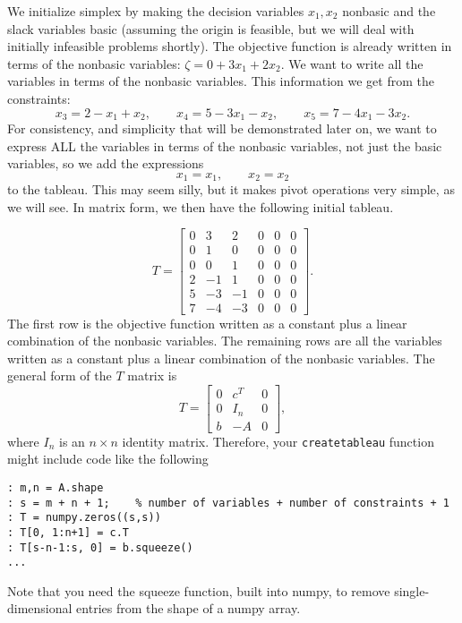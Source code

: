 We initialize simplex by making the decision variables $x_1, x_2$ nonbasic and the slack variables basic (assuming the origin is feasible, but we will deal with initially infeasible problems shortly).
The objective function is already written in terms of the nonbasic variables: $\zeta = 0 + 3x_1 + 2x_2$.
We want to write all the variables in terms of the nonbasic variables. This information we get from the constraints:
\[ x_3 = 2 - x_1 + x_2, \qquad x_4 = 5 - 3x_1 - x_2, \qquad x_5 = 7 - 4x_1 - 3x_2. \]
For consistency, and simplicity that will be demonstrated later on, we want to express ALL the variables in terms of the nonbasic variables, not just the basic variables, so we add the expressions
\[ x_1 = x_1, \qquad x_2 = x_2 \]
to the tableau.
This may seem silly, but it makes pivot operations very simple, as we will see.
In matrix form, we then have the following initial tableau.

\[
	T = \begin{bmatrix}
		0 & 3 & 2 & 0 & 0 & 0 \\
		0 & 1 & 0 & 0 & 0 & 0 \\
		0 & 0 & 1 & 0 & 0 & 0 \\
		2 &-1 & 1 & 0 & 0 & 0 \\
		5 &-3 &-1 & 0 & 0 & 0 \\
		7 &-4 &-3 & 0 & 0 & 0
	\end{bmatrix}.
\]
The first row is the objective function written as a constant plus a linear combination of the nonbasic variables.
The remaining rows are all the variables written as a constant plus a linear combination of the nonbasic variables.
The general form of the $T$ matrix is
\[ T = \begin{bmatrix}
    0 & c^T   & 0 \\
    0 & I_n & 0 \\
    b & -A  & 0
\end{bmatrix}, \]
where $I_n$ is an $n \times n$ identity matrix.
Therefore, your {\tt createtableau} function might include code like the following

\begin{lstlisting}[style=python]
: m,n = A.shape
: s = m + n + 1;    % number of variables + number of constraints + 1
: T = numpy.zeros((s,s))
: T[0, 1:n+1] = c.T
: T[s-n-1:s, 0] = b.squeeze()
...
\end{lstlisting}

Note that you need the squeeze function, built into numpy, to remove single-dimensional entries from the shape of a numpy array. 

